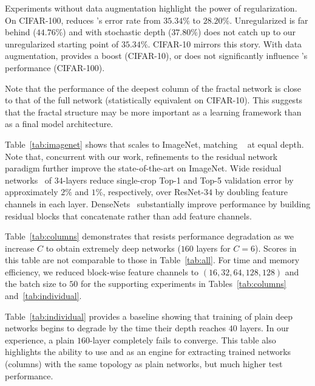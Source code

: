 Experiments without data augmentation highlight the power of {\droppath}
regularization.  On CIFAR-100, {\droppath} reduces {\fracnet}'s error rate
from $35.34\%$ to $28.20\%$.  Unregularized {\resnet} is far behind ($44.76\%$)
and {\resnet} with stochastic depth ($37.80\%$) does not catch up to our
unregularized starting point of $35.34\%$.  CIFAR-10 mirrors this story.  With
data augmentation, {\droppath} provides a boost (CIFAR-10), or does not
significantly influence {\fracnet}'s performance (CIFAR-100).

Note that the performance of the deepest column of the fractal network is
close to that of the full network (statistically equivalent on CIFAR-10).
This suggests that the fractal structure may be more important as a
learning framework than as a final model architecture.

Table~\ref{tab:imagenet} shows that {\fracnet} scales to ImageNet,
matching {\resnet}~\citep{he2015deep} at equal depth.  Note that, concurrent
with our work, refinements to the residual network paradigm further improve
the state-of-the-art on ImageNet.  Wide residual networks~\citep{wideresnet}
of $34$-layers reduce single-crop Top-1 and Top-5 validation error by
approximately $2\%$ and $1\%$, respectively, over ResNet-$34$ by doubling
feature channels in each layer.  DenseNets~\citep{densenet} substantially
improve performance by building residual blocks that concatenate rather than
add feature channels.

Table~\ref{tab:columns} demonstrates that {\fracnet} resists performance
degradation as we increase $C$ to obtain extremely deep networks ($160$ layers
for $C=6$).  Scores in this table are not comparable to those in
Table~\ref{tab:all}.  For time and memory efficiency, we reduced block-wise
feature channels to $(16, 32, 64, 128, 128)$ and the batch size to $50$ for the
supporting experiments in Tables~\ref{tab:columns} and~\ref{tab:individual}.

Table~\ref{tab:individual} provides a baseline showing that training of plain
deep networks begins to degrade by the time their depth reaches $40$ layers.
In our experience, a plain $160$-layer completely fails to converge. This
table also highlights the ability to use {\fracnet} and {\droppath} as an
engine for extracting trained networks (columns) with the same topology as
plain networks, but much higher test performance.

